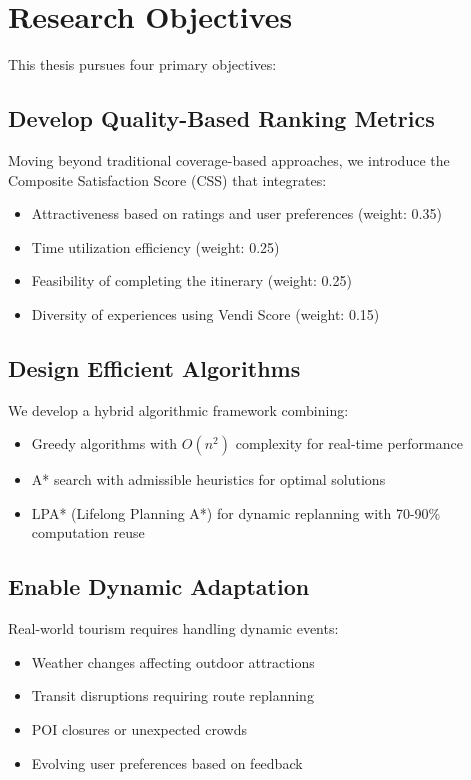 \section{Research Objectives}

This thesis pursues four primary objectives:

\subsection{Develop Quality-Based Ranking Metrics}
Moving beyond traditional coverage-based approaches, we introduce the Composite Satisfaction Score (CSS) that integrates:
\begin{itemize}
    \item Attractiveness based on ratings and user preferences (weight: 0.35)
    \item Time utilization efficiency (weight: 0.25)
    \item Feasibility of completing the itinerary (weight: 0.25)
    \item Diversity of experiences using Vendi Score (weight: 0.15)
\end{itemize}

\subsection{Design Efficient Algorithms}
We develop a hybrid algorithmic framework combining:
\begin{itemize}
    \item Greedy algorithms with $O(n^2)$ complexity for real-time performance
    \item A* search with admissible heuristics for optimal solutions
    \item LPA* (Lifelong Planning A*) for dynamic replanning with 70-90\% computation reuse
\end{itemize}

\subsection{Enable Dynamic Adaptation}
Real-world tourism requires handling dynamic events:
\begin{itemize}
    \item Weather changes affecting outdoor attractions
    \item Transit disruptions requiring route replanning
    \item POI closures or unexpected crowds
    \item Evolving user preferences based on feedback
\end{itemize}

